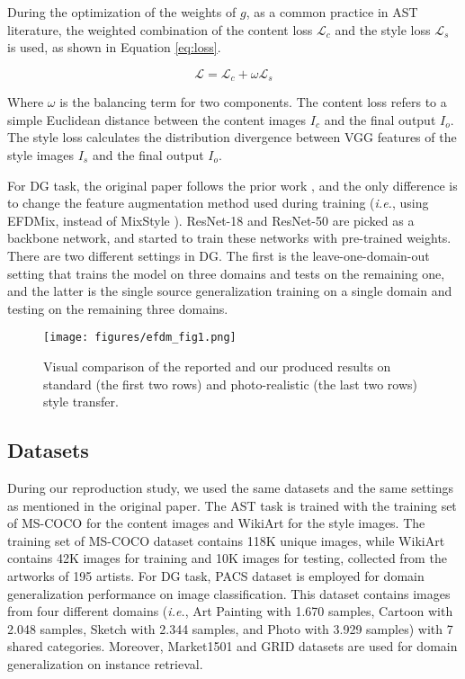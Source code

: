 During the optimization of the weights of $g$, as a common practice in AST literature, the weighted combination of the content loss $\mathcal{L}_{c}$ and the style loss $\mathcal{L}_{s}$ is used, as shown in Equation \ref{eq:loss}.

\begin{equation}
   \mathcal{L} = \mathcal{L}_c + \omega \mathcal{L}_s
   \label{eq:loss}
\end{equation}

Where $\omega$ is the balancing term for two components. The content loss refers to a simple Euclidean distance between the content images $I_c$ and the final output $I_o$. The style loss calculates the distribution divergence between VGG features of the style images $I_s$ and the final output $I_o$.

For DG task, the original paper follows the prior work \cite{zhou2020domain}, and the only difference is to change the feature augmentation method used during training (\textit{i.e.}, using EFDMix, instead of MixStyle \cite{zhou2020domain}). ResNet-18 and ResNet-50 \cite{he2016deep} are picked as a backbone network, and started to train these networks with pre-trained weights. There are two different settings in DG. The first is the leave-one-domain-out setting that trains the model on three domains and tests on the remaining one, and the latter is the single source generalization training on a single domain and testing on the remaining three domains. 

\begin{figure}[!t]  
  \texttt{[image: figures/efdm\_fig1.png]}  
  \caption{Visual comparison of the reported and our produced results on standard \cite{huang2017arbitrary} (the first two rows) and photo-realistic \cite{luan2017deep} (the last two rows) style transfer.}
\label{fig:fig1}
\end{figure}

\subsection{Datasets}

During our reproduction study, we used the same datasets and the same settings as mentioned in the original paper. The AST task is trained with the training set of MS-COCO \cite{lin2014microsoft} for the content images and WikiArt \cite{artgan2018} for the style images. The training set of MS-COCO dataset contains 118K unique images, while WikiArt contains 42K images for training and 10K images for testing, collected from the artworks of 195 artists. For DG task, PACS dataset \cite{li2017deeper} is employed for domain generalization performance on image classification. This dataset contains images from four different domains (\textit{i.e.}, Art Painting with 1.670 samples, Cartoon with 2.048 samples, Sketch with 2.344 samples, and Photo with 3.929 samples) with 7 shared categories. Moreover, Market1501 \cite{zheng2015scalable} and GRID \cite{loy2009multi} datasets are used for domain generalization on instance retrieval.


